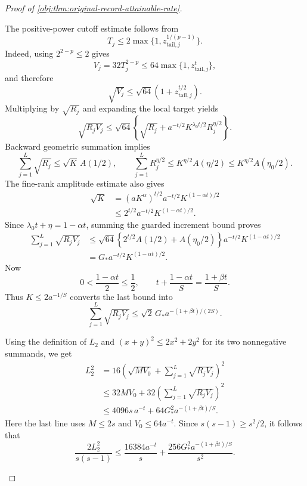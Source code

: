 \begin{proof}[Proof of \cref{obj:thm:original-record-attainable-rate}]
\begin{enumerate}
The positive-power cutoff estimate follows from
\[
T_j\le2\max\{1,z_{\mathrm{tail},j}^{1/(p-1)}\}.
\]
Indeed, using \(2^{2-p}\le2\) gives
\[
V_j=32T_j^{2-p}
\le64\max\{1,z_{\mathrm{tail},j}^{t}\},
\]
and therefore
\[
\sqrt{V_j}
\le\sqrt{64}\left(1+z_{\mathrm{tail},j}^{t/2}\right).
\]
Multiplying by \(\sqrt{R_j}\) and expanding the local target yields
\[
\sqrt{R_jV_j}
\le\sqrt{64}
\left\{
\sqrt{R_j}
+a^{-t/2}K^{\lambda_0t/2}R_j^{\eta/2}
\right\}.
\]
Backward geometric summation implies
\[
\sum_{j=1}^{L}\sqrt{R_j}
\le\sqrt K\,A(1/2),
\qquad
\sum_{j=1}^{L}R_j^{\eta/2}
\le K^{\eta/2}A(\eta/2)
\le K^{\eta/2}A(\eta_0/2).
\]
The fine-rank amplitude estimate also gives
\[
\begin{aligned}
\sqrt K
&=(aK^\alpha)^{t/2}
  a^{-t/2}K^{(1-\alpha t)/2}\\
&\le2^{t/2}a^{-t/2}K^{(1-\alpha t)/2}.
\end{aligned}
\]
Since \(\lambda_0t+\eta=1-\alpha t\), summing the guarded increment bound proves
\[
\begin{aligned}
\sum_{j=1}^{L}\sqrt{R_jV_j}
&\le\sqrt{64}
 \left\{2^{t/2}A(1/2)+A(\eta_0/2)\right\}
 a^{-t/2}K^{(1-\alpha t)/2}\\
&=G_*a^{-t/2}K^{(1-\alpha t)/2}.
\end{aligned}
\]
Now
\[
0<\frac{1-\alpha t}{2}\le\frac12,
\qquad
t+\frac{1-\alpha t}{S}=\frac{1+\beta t}{S}.
\]
Thus \(K\le2a^{-1/S}\) converts the last bound into
\[
\sum_{j=1}^{L}\sqrt{R_jV_j}
\le\sqrt2\,G_*a^{-(1+\beta t)/(2S)}.
\]

Using the definition of \(L_2\) and \((x+y)^2\le2x^2+2y^2\) for its two nonnegative summands, we get
\[
\begin{aligned}
L_2^2
&=16\left(
\sqrt{MV_0}+\sum_{j=1}^{L}\sqrt{R_jV_j}
\right)^2\\
&\le32MV_0
 +32\left(\sum_{j=1}^{L}\sqrt{R_jV_j}\right)^2\\
&\le4096s\,a^{-t}
 +64G_*^2a^{-(1+\beta t)/S}.
\end{aligned}
\]
Here the last line uses \(M\le2s\) and \(V_0\le64a^{-t}\).
Since \(s(s-1)\ge s^2/2\), it follows that
\[
\frac{2L_2^2}{s(s-1)}
\le\frac{16384a^{-t}}{s}
 +\frac{256G_*^2a^{-(1+\beta t)/S}}{s^2}.
\]


\end{enumerate}
\end{proof}
